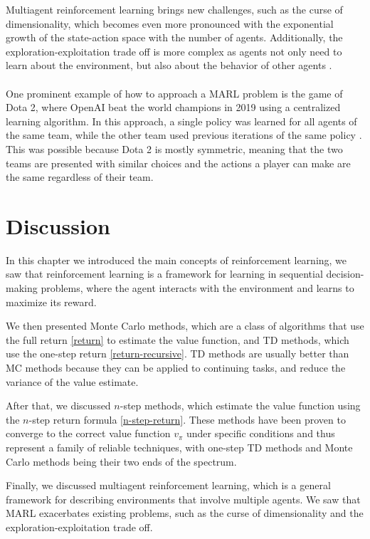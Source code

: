 Multiagent reinforcement learning brings new challenges, such as the curse of dimensionality, which becomes even more pronounced with the exponential growth of the state-action space with the number of agents. Additionally, the exploration-exploitation trade off is more complex as agents not only need to learn about the environment, but also about the behavior of other agents \cite{marl}.\\\\
One prominent example of how to approach a MARL problem is the game of Dota 2, where OpenAI beat the world champions in 2019 using a centralized learning algorithm. In this approach, a single policy was learned for all agents of the same team, while the other team used previous iterations of the same policy \cite{open-ai-five}. This was possible because Dota 2 is mostly symmetric, meaning that the two teams are presented with similar choices and the actions a player can make are the same regardless of their team.

\section{Discussion}
In this chapter we introduced the main concepts of reinforcement learning, we saw that reinforcement learning is a framework for learning in sequential decision-making problems, where the agent interacts with the environment and learns to maximize its reward.

We then presented Monte Carlo methods, which are a class of algorithms that use the full return \eqref{return} to estimate the value function, and TD methods, which use the one-step return \eqref{return-recursive}. TD methods are usually better than MC methods because they can be applied to continuing tasks, and reduce the variance of the value estimate.

After that, we discussed $n$-step methods, which estimate the value function using the $n$-step return formula \eqref{n-step-return}. These methods have been proven to converge to the correct value function $v_{\pi}$ under specific conditions and thus represent a family of reliable techniques, with one-step TD methods and Monte Carlo methods being their two ends of the spectrum.

Finally, we discussed multiagent reinforcement learning, which is a general framework for describing environments that involve multiple agents. We saw that MARL exacerbates existing problems, such as the curse of dimensionality and the exploration-exploitation trade off.\\
